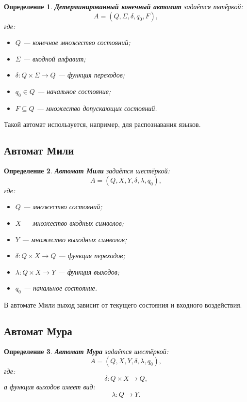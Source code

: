 \documentclass[12pt,a4paper]{article}
\newtheorem{definition}{Определение}
\begin{document}
\begin{definition}
\textbf{Детерминированный конечный автомат} задаётся пятёркой:
\[
    A = (Q, \Sigma, \delta, q_0, F),
\]
где:
\begin{itemize}
    \item $Q$ --- конечное множество состояний;
    \item $\Sigma$ --- входной алфавит;
    \item $\delta: Q \times \Sigma \to Q$ --- функция переходов;
    \item $q_0 \in Q$ --- начальное состояние;
    \item $F \subseteq Q$ --- множество допускающих состояний.
\end{itemize}
\end{definition}

Такой автомат используется, например, для распознавания языков.

\subsection{Автомат Мили}

\begin{definition}
\textbf{Автомат Мили} задаётся шестёркой:
\[
    A = (Q, X, Y, \delta, \lambda, q_0),
\]
где:
\begin{itemize}
    \item $Q$ --- множество состояний;
    \item $X$ --- множество входных символов;
    \item $Y$ --- множество выходных символов;
    \item $\delta: Q \times X \to Q$ --- функция переходов;
    \item $\lambda: Q \times X \to Y$ --- функция выходов;
    \item $q_0$ --- начальное состояние.
\end{itemize}
\end{definition}

В автомате Мили выход зависит от текущего состояния и входного воздействия.

\subsection{Автомат Мура}

\begin{definition}
\textbf{Автомат Мура} задаётся шестёркой:
\[
    A = (Q, X, Y, \delta, \lambda, q_0),
\]
где:
\[
    \delta: Q \times X \to Q,
\]
а функция выходов имеет вид:
\[
    \lambda: Q \to Y.
\]
\end{definition}
\end{document}
